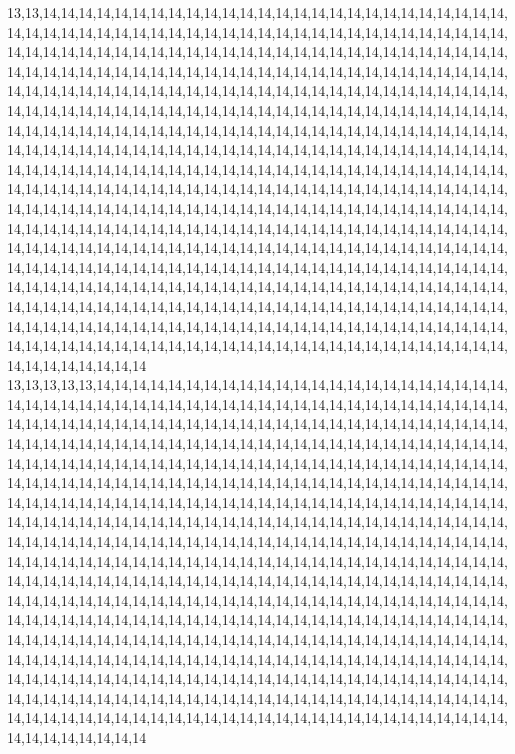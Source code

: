 13,13,14,14,14,14,14,14,14,14,14,14,14,14,14,14,14,14,14,14,14,14,14,14,14,14,14,14,14,14,14,14,14,14,14,14,14,14,14,14,14,14,14,14,14,14,14,14,14,14,14,14,14,14,14,14,14,14,14,14,14,14,14,14,14,14,14,14,14,14,14,14,14,14,14,14,14,14,14,14,14,14,14,14,14,14,14,14,14,14,14,14,14,14,14,14,14,14,14,14,14,14,14,14,14,14,14,14,14,14,14,14,14,14,14,14,14,14,14,14,14,14,14,14,14,14,14,14,14,14,14,14,14,14,14,14,14,14,14,14,14,14,14,14,14,14,14,14,14,14,14,14,14,14,14,14,14,14,14,14,14,14,14,14,14,14,14,14,14,14,14,14,14,14,14,14,14,14,14,14,14,14,14,14,14,14,14,14,14,14,14,14,14,14,14,14,14,14,14,14,14,14,14,14,14,14,14,14,14,14,14,14,14,14,14,14,14,14,14,14,14,14,14,14,14,14,14,14,14,14,14,14,14,14,14,14,14,14,14,14,14,14,14,14,14,14,14,14,14,14,14,14,14,14,14,14,14,14,14,14,14,14,14,14,14,14,14,14,14,14,14,14,14,14,14,14,14,14,14,14,14,14,14,14,14,14,14,14,14,14,14,14,14,14,14,14,14,14,14,14,14,14,14,14,14,14,14,14,14,14,14,14,14,14,14,14,14,14,14,14,14,14,14,14,14,14,14,14,14,14,14,14,14,14,14,14,14,14,14,14,14,14,14,14,14,14,14,14,14,14,14,14,14,14,14,14,14,14,14,14,14,14,14,14,14,14,14,14,14,14,14,14,14,14,14,14,14,14,14,14,14,14,14,14,14,14,14,14,14,14,14,14,14,14,14,14,14,14,14,14,14,14,14,14,14,14,14,14,14,14,14,14,14,14,14,14,14,14,14,14,14,14,14,14,14,14,14,14,14,14,14,14,14,14,14,14,14,14,14,14,14,14,14,14,14,14,14,14,14,14,14,14,14,14,14,14,14,14,14,14,14,14,14,14,14,14,14,14,14,14,14,14,14,14,14,14,14,14,14,14,14,14,14,14,14,14,14,14,14,14,14,14,14,14,14,14,14,14,14,14,14,14,14,14,14,14,14,14,14,14,14,14
13,13,13,13,13,14,14,14,14,14,14,14,14,14,14,14,14,14,14,14,14,14,14,14,14,14,14,14,14,14,14,14,14,14,14,14,14,14,14,14,14,14,14,14,14,14,14,14,14,14,14,14,14,14,14,14,14,14,14,14,14,14,14,14,14,14,14,14,14,14,14,14,14,14,14,14,14,14,14,14,14,14,14,14,14,14,14,14,14,14,14,14,14,14,14,14,14,14,14,14,14,14,14,14,14,14,14,14,14,14,14,14,14,14,14,14,14,14,14,14,14,14,14,14,14,14,14,14,14,14,14,14,14,14,14,14,14,14,14,14,14,14,14,14,14,14,14,14,14,14,14,14,14,14,14,14,14,14,14,14,14,14,14,14,14,14,14,14,14,14,14,14,14,14,14,14,14,14,14,14,14,14,14,14,14,14,14,14,14,14,14,14,14,14,14,14,14,14,14,14,14,14,14,14,14,14,14,14,14,14,14,14,14,14,14,14,14,14,14,14,14,14,14,14,14,14,14,14,14,14,14,14,14,14,14,14,14,14,14,14,14,14,14,14,14,14,14,14,14,14,14,14,14,14,14,14,14,14,14,14,14,14,14,14,14,14,14,14,14,14,14,14,14,14,14,14,14,14,14,14,14,14,14,14,14,14,14,14,14,14,14,14,14,14,14,14,14,14,14,14,14,14,14,14,14,14,14,14,14,14,14,14,14,14,14,14,14,14,14,14,14,14,14,14,14,14,14,14,14,14,14,14,14,14,14,14,14,14,14,14,14,14,14,14,14,14,14,14,14,14,14,14,14,14,14,14,14,14,14,14,14,14,14,14,14,14,14,14,14,14,14,14,14,14,14,14,14,14,14,14,14,14,14,14,14,14,14,14,14,14,14,14,14,14,14,14,14,14,14,14,14,14,14,14,14,14,14,14,14,14,14,14,14,14,14,14,14,14,14,14,14,14,14,14,14,14,14,14,14,14,14,14,14,14,14,14,14,14,14,14,14,14,14,14,14,14,14,14,14,14,14,14,14,14,14,14,14,14,14,14,14,14,14,14,14,14,14,14,14,14,14,14,14,14,14,14,14,14,14,14,14,14,14,14,14,14,14,14,14,14,14,14,14,14,14,14,14,14,14,14,14,14,14,14,14,14,14,14,14,14,14,14
